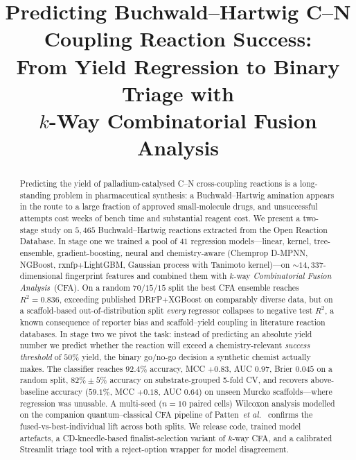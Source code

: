 \documentclass[conference]{IEEEtran}
\begin{document}
\title{Predicting Buchwald--Hartwig C--N Coupling Reaction Success:\\
       From Yield Regression to Binary Triage with\\
       $k$-Way Combinatorial Fusion Analysis}

\author{
\and
{}
}

\maketitle

\begin{abstract}
Predicting the yield of palladium-catalysed C--N cross-coupling reactions is
a long-standing problem in pharmaceutical synthesis: a Buchwald--Hartwig
amination appears in the route to a large fraction of approved
small-molecule drugs, and unsuccessful attempts cost weeks of bench time and
substantial reagent cost. We present a two-stage study on $5{,}465$
Buchwald--Hartwig reactions extracted from the Open Reaction Database. In
stage one we trained a pool of $41$ regression models---linear, kernel,
tree-ensemble, gradient-boosting, neural and chemistry-aware (Chemprop
D-MPNN, NGBoost, rxnfp+LightGBM, Gaussian process with Tanimoto kernel)---on
$\sim$$14{,}337$-dimensional fingerprint features and combined them with
$k$-way \emph{Combinatorial Fusion Analysis}~(CFA). On a random $70/15/15$
split the best CFA ensemble reaches $R^{2}=0.836$, exceeding published
DRFP+XGBoost on comparably diverse data, but on a scaffold-based
out-of-distribution split \emph{every} regressor collapses to negative test
$R^{2}$, a known consequence of reporter bias and scaffold--yield coupling
in literature reaction databases. In stage two we pivot the task: instead of
predicting an absolute yield number we predict whether the reaction will
exceed a chemistry-relevant \emph{success threshold} of $50\%$ yield, the
binary go/no-go decision a synthetic chemist actually makes. The classifier
reaches $92.4\%$ accuracy, MCC $+0.83$, AUC $0.97$, Brier $0.045$ on a
random split, $82\%\pm5\%$ accuracy on substrate-grouped 5-fold CV, and
recovers above-baseline accuracy ($59.1\%$, MCC $+0.18$, AUC $0.64$) on
unseen Murcko scaffolds---where regression was unusable. A multi-seed
($n\!=\!10$ paired cells) Wilcoxon analysis modelled on the companion
quantum--classical CFA pipeline of
Patten~\textit{et al.}~\cite{Patten2026Quantum} confirms the
fused-vs-best-individual lift across both splits. We release code,
trained model artefacts, a CD-kneedle-based finalist-selection variant
of $k$-way CFA, and a calibrated Streamlit triage tool with a
reject-option wrapper for model disagreement.
\end{abstract}
\end{document}
